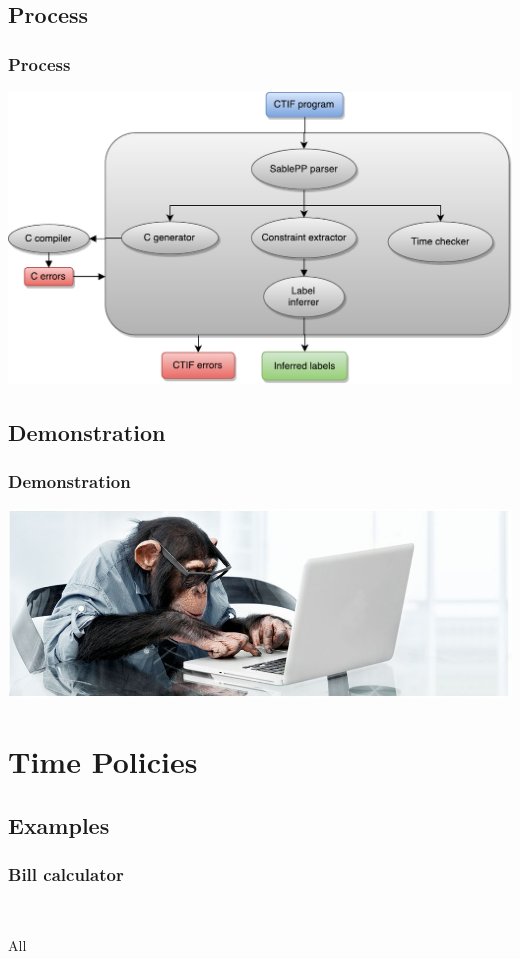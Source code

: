 \documentclass[10pt]{beamer}
\begin{document}
\subsection{Process}
\begin{frame}
  \frametitle{Process}
  \includegraphics[width=\textwidth]{figures/thetool.pdf}
\end{frame}

\subsection{Demonstration}
\begin{frame}
  \frametitle{Demonstration}
  \centering

  \includegraphics[width=\textwidth]{figures/codemonkey}
\end{frame}

\section{Time Policies}

\subsection{Examples}
\begin{frame}
  \frametitle{Bill calculator}
  \centering

  \\[2em]

  \begin{block}{All}
    \centering
    \scalebox{.8}{}
  \end{block}
  \begin{block}{}
    \centering
    \scalebox{.8}{}
  \end{block}
\end{frame}
\end{document}
